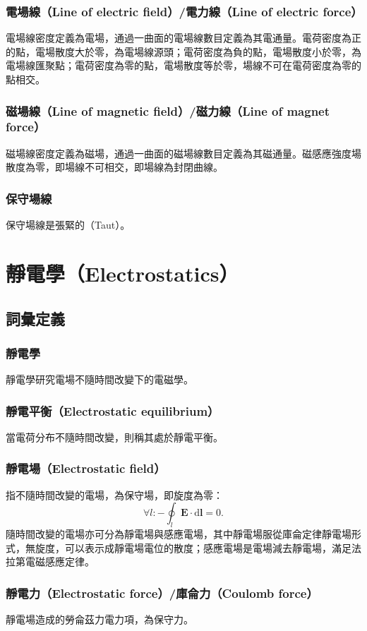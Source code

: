 \documentclass[a4paper,12pt]{report}
\begin{document}
\begin{itemize}
\subsubsection{電場線（Line of electric field）/電力線（Line of electric force）}
電場線密度定義為電場，通過一曲面的電場線數目定義為其電通量。電荷密度為正的點，電場散度大於零，為電場線源頭；電荷密度為負的點，電場散度小於零，為電場線匯聚點；電荷密度為零的點，電場散度等於零，場線不可在電荷密度為零的點相交。
\subsubsection{磁場線（Line of magnetic field）/磁力線（Line of magnet force）}
磁場線密度定義為磁場，通過一曲面的磁場線數目定義為其磁通量。磁感應強度場散度為零，即場線不可相交，即場線為封閉曲線。
\subsubsection{保守場線}
保守場線是張緊的（Taut）。


\section{靜電學（Electrostatics）}
\subsection{詞彙定義}
\subsubsection{靜電學}
靜電學研究電場不隨時間改變下的電磁學。
\subsubsection{靜電平衡（Electrostatic equilibrium）}
當電荷分布不隨時間改變，則稱其處於靜電平衡。
\subsubsection{靜電場（Electrostatic field）}
指不隨時間改變的電場，為保守場，即旋度為零：
\[\forall l\colon-\oint_{l}\mathbf{E}\cdot\mathrm{d}\mathbf{l}=0.\]
隨時間改變的電場亦可分為靜電場與感應電場，其中靜電場服從庫侖定律靜電場形式，無旋度，可以表示成靜電場電位的散度；感應電場是電場減去靜電場，滿足法拉第電磁感應定律。
\subsubsection{靜電力（Electrostatic force）/庫侖力（Coulomb force）}
靜電場造成的勞侖茲力電力項，為保守力。

\end{itemize}
\end{document}
